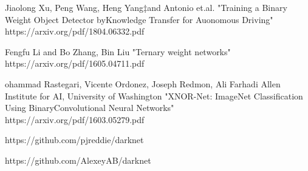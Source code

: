 \documentclass[twocolumn]{article}
\begin{document}
\begin{thebibliography}{99}
 \item Jiaolong Xu, Peng Wang, Heng Yang‡and Antonio et.al.
 "Training a Binary Weight Object Detector byKnowledge Transfer for Auonomous Driving" https://arxiv.org/pdf/1804.06332.pdf
 \item Fengfu Li and Bo Zhang, Bin Liu "Ternary weight networks" https://arxiv.org/pdf/1605.04711.pdf
 \item ohammad Rastegari, Vicente Ordonez, Joseph Redmon, Ali Farhadi Allen Institute for AI, University of Washington
 "XNOR-Net: ImageNet Classification Using BinaryConvolutional Neural Networks" https://arxiv.org/pdf/1603.05279.pdf
 \item https://github.com/pjreddie/darknet
 \item https://github.com/AlexeyAB/darknet

\end{thebibliography}
\end{document}
